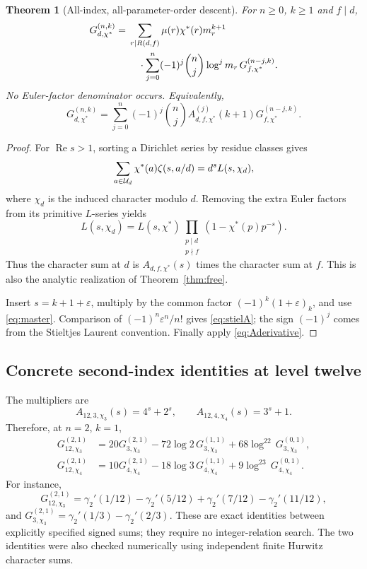 \documentclass[11pt]{article}
\numberwithin{equation}{section}
\newtheorem{theorem}{Theorem}[section]
\theoremstyle{definition}\newtheorem{definition}[theorem]{Definition}
\theoremstyle{remark}\newtheorem{remark}[theorem]{Remark}
\DeclareMathOperator{\Rea}{Re}
\newcommand{\eps}{\varepsilon}
\newcommand{\ch}{\chi^*}
\begin{document}
\begin{theorem}[All-index, all-parameter-order descent]\label{thm:stieltjes}
For $n\ge0$, $k\ge1$ and $f\mid d$,
\begin{align}\label{eq:stieldescent}
G_{d,\ch}^{(n,k)}
={}&\sum_{r\mid R(d,f)}\mu(r)\ch(r)m_r^{k+1}\notag\\
&\quad\cdot\sum_{j=0}^{n}(-1)^j\binom nj\log^j m_r\,
G_{f,\ch}^{(n-j,k)}.
\end{align}
No Euler-factor denominator occurs. Equivalently,
\begin{equation}\label{eq:stielA}
G_{d,\ch}^{(n,k)}=
\sum_{j=0}^{n}(-1)^j\binom nj A_{d,f,\ch}^{(j)}(k+1)
G_{f,\ch}^{(n-j,k)}.
\end{equation}
\end{theorem}
\begin{proof}
For $\Rea s>1$, sorting a Dirichlet series by residue classes gives
\[
\sum_{a\in\U_d}\ch(a)\zeta(s,a/d)=d^sL(s,\chi_d),
\]
where $\chi_d$ is the induced character modulo $d$. Removing the extra
Euler factors from its primitive $L$-series yields
\[
L(s,\chi_d)=L(s,\ch)
\prod_{\substack{p\mid d\\p\nmid f}}(1-\ch(p)p^{-s}).
\]
Thus the character sum at $d$ is $A_{d,f,\ch}(s)$ times the character
sum at $f$. This is also the analytic realization of
Theorem~\ref{thm:free}.

Insert $s=k+1+\eps$, multiply by the common factor
$(-1)^k(1+\eps)_k$, and use \eqref{eq:master}. Comparison of
$(-1)^n\eps^n/n!$ gives \eqref{eq:stielA}; the sign $(-1)^j$ comes
from the Stieltjes Laurent convention. Finally apply
\eqref{eq:Aderivative}.
\end{proof}

\subsection{Concrete second-index identities at level twelve}

The multipliers are
\[
A_{12,3,\chi_3}(s)=4^s+2^s,\qquad
A_{12,4,\chi_4}(s)=3^s+1.
\]
Therefore, at $n=2$, $k=1$,
\begin{align}\label{eq:examplegamma}
G_{12,\chi_3}^{(2,1)}
&=20G_{3,\chi_3}^{(2,1)}
-72\log2\,G_{3,\chi_3}^{(1,1)}
+68\log^22\,G_{3,\chi_3}^{(0,1)},\\
G_{12,\chi_4}^{(2,1)}
&=10G_{4,\chi_4}^{(2,1)}
-18\log3\,G_{4,\chi_4}^{(1,1)}
+9\log^23\,G_{4,\chi_4}^{(0,1)}.
\end{align}
For instance,
\[
G_{12,\chi_3}^{(2,1)}=
\gamma_2'(1/12)-\gamma_2'(5/12)+\gamma_2'(7/12)-\gamma_2'(11/12),
\]
and $G_{3,\chi_3}^{(2,1)}=\gamma_2'(1/3)-\gamma_2'(2/3)$.
These are exact identities between explicitly specified signed sums; they
require no integer-relation search. The two identities were also checked
numerically using independent finite Hurwitz character sums.
\end{document}
